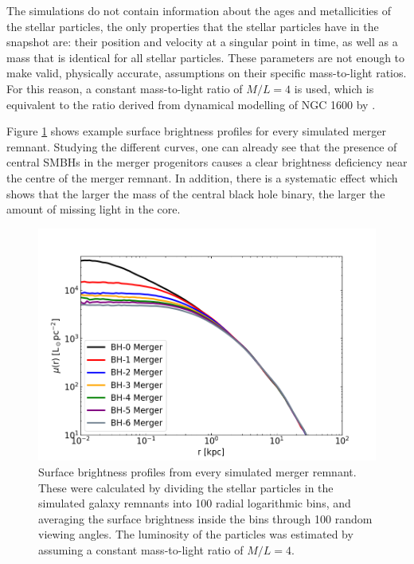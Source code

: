\documentclass[english, oneside]{HYgradu}
\begin{document}
The simulations do not contain information about the ages and metallicities of the stellar particles, the only properties that the stellar particles have in the snapshot are: their position and velocity at a singular point in time, as well as a mass that is identical for all stellar particles. These parameters are not enough to make valid, physically accurate, assumptions on their specific mass-to-light ratios. For this reason, a constant mass-to-light ratio of $M/L = 4$ is used, which is equivalent to the ratio derived from dynamical modelling of NGC 1600 by \cite{Thomas2016}.

Figure \ref{figure:surface_brightness} shows example surface brightness profiles for every simulated merger remnant. Studying the different curves, one can already see that the presence of central SMBHs in the merger progenitors causes a clear brightness deficiency near the centre of the merger remnant. In addition, there is a systematic effect which shows that the larger the mass of the central black hole binary, the larger the amount of missing light in the core.

\begin{figure}[h]
	\centering
	\includegraphics[width=\textwidth]{SurfaceBrightnessProfiles.png}
	\caption{Surface brightness profiles from every simulated merger remnant. These were calculated by dividing the stellar particles in the simulated galaxy remnants into 100 radial logarithmic bins, and averaging the surface brightness inside the bins through 100 random viewing angles. The luminosity of the particles was estimated by assuming a constant mass-to-light ratio of $M/L = 4$.}
	\label{figure:surface_brightness}
\end{figure}
\end{document}
